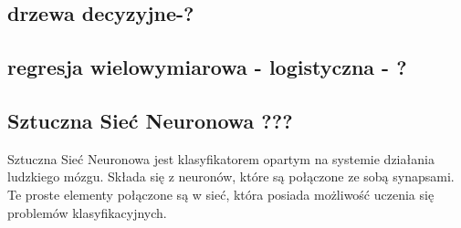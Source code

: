 \documentclass[12pt,a4paper]{report}
\begin{document}
\subsection{drzewa decyzyjne-?}
\subsection{regresja wielowymiarowa - logistyczna - ?}
\subsection{Sztuczna Sieć Neuronowa ???}
Sztuczna Sieć Neuronowa jest klasyfikatorem opartym na systemie działania ludzkiego mózgu. Składa się z neuronów, które są połączone ze sobą synapsami. Te proste elementy połączone są w sieć, która posiada możliwość uczenia się problemów klasyfikacyjnych.
\\
\end{document}
